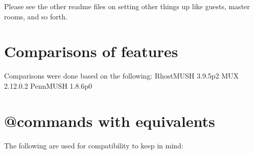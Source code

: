 \documentclass[letterpaper,10pt,english]{sphinxmanual}
\begin{document}
\sphinxAtStartPar
Please see the other readme files on setting other things up like
guests, master rooms, and so forth.


\section{Comparisons of features}
\label{\detokenize{31-comparison:comparisons-of-features}}
\sphinxAtStartPar
Comparisons were done based on the following:
RhostMUSH 3.9.5p2
MUX 2.12.0.2
PennMUSH 1.8.6p0


\section{@commands with equivalents}
\label{\detokenize{31-comparison:commands-with-equivalents}}
\sphinxAtStartPar
The following are used for compatibility to keep in mind:
\end{document}
